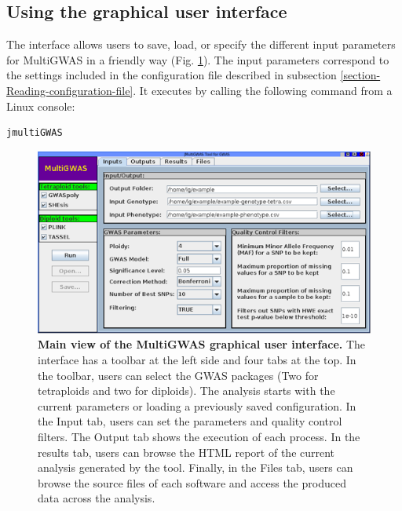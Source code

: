 \documentclass{article}
\begin{document}

\subsection{Using the graphical user interface}
The interface allows users to save, load, or specify the different input parameters for MultiGWAS in a friendly way (Fig. \ref{fig:MultiGWAS-interaction}). The input parameters correspond to the settings included in the configuration file described in subsection \ref{section-Reading-configuration-file}. It executes by calling the following command from a Linux console:

\begin{lstlisting}[language=bash,basicstyle={\small}]
jmultiGWAS
\end{lstlisting}

\begin{figure}[H]
\begin{centering}
\includegraphics[scale=0.5]{images/paper-implementation-jmultiGWAS}
\par\end{centering}
\caption{\textbf{Main view of the MultiGWAS graphical user interface.}  The interface has a toolbar at the left side and four tabs at the top. In the toolbar, users can select the GWAS packages (Two for tetraploids and two for diploids). The analysis starts with the current parameters or loading a previously saved configuration. In the Input tab, users can set the parameters and quality control filters. The Output tab shows the execution of each process. In the results tab, users can browse the HTML report of the current analysis generated by the tool. Finally, in the Files tab, users can browse the source files of each software and access the produced data across the analysis.}\label{fig:MultiGWAS-interaction} 
\end{figure}
\end{document}
